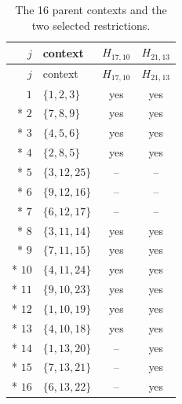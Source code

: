 \documentclass[aps,pra,reprint,superscriptaddress,longbibliography,nofootinbib,floatfix,10pt]{revtex4-2}
\theoremstyle{definition}
\begin{document}
\begingroup\small\setlength{\LTpre}{6pt}\setlength{\LTpost}{8pt}
\begin{longtable}{rlcc}
\caption{The 16 parent contexts and the two selected restrictions.}\label{tab:contexts}\\
\toprule $j$ & context & $H_{17,10}$ & $H_{21,13}$\\\midrule
\endfirsthead
\toprule $j$ & context & $H_{17,10}$ & $H_{21,13}$\\\midrule
\endhead
\bottomrule\endfoot
$1$ & $\{1,2,3\}$ & yes & yes \\*
$2$ & $\{7,8,9\}$ & yes & yes \\*
$3$ & $\{4,5,6\}$ & yes & yes \\*
$4$ & $\{2,8,5\}$ & yes & yes \\*
$5$ & $\{3,12,25\}$ & -- & -- \\*
$6$ & $\{9,12,16\}$ & -- & -- \\*
$7$ & $\{6,12,17\}$ & -- & -- \\*
$8$ & $\{3,11,14\}$ & yes & yes \\*
$9$ & $\{7,11,15\}$ & yes & yes \\*
$10$ & $\{4,11,24\}$ & yes & yes \\*
$11$ & $\{9,10,23\}$ & yes & yes \\*
$12$ & $\{1,10,19\}$ & yes & yes \\*
$13$ & $\{4,10,18\}$ & yes & yes \\*
$14$ & $\{1,13,20\}$ & -- & yes \\*
$15$ & $\{7,13,21\}$ & -- & yes \\*
$16$ & $\{6,13,22\}$ & -- & yes \\
\end{longtable}\endgroup
\end{document}
